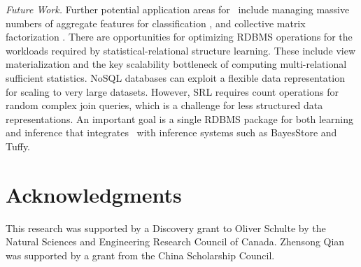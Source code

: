 {\em Future Work.} Further potential application areas for \FB\ include managing massive numbers of aggregate features for classification \cite{Popescul2007}, and collective matrix factorization \cite{Singh2008,Singh2013}. 
There are opportunities for optimizing RDBMS operations for the workloads required by statistical-relational structure learning. These include view materialization and the key scalability bottleneck of computing multi-relational sufficient statistics. NoSQL databases can exploit a flexible data representation for scaling to very large datasets. However, SRL requires count operations for random complex join queries, which is a challenge for less structured data representations. An important goal is a single RDBMS package for both learning and inference that integrates \FB\ with inference systems such as BayesStore and Tuffy. 
%


\section{Acknowledgments}
%
This research was supported by a Discovery grant to Oliver Schulte by the Natural Sciences and Engineering Research Council of Canada. 
Zhensong Qian was supported by a grant from the China Scholarship Council.


